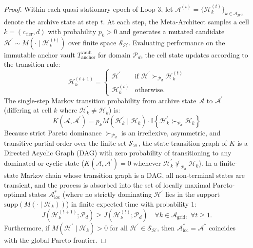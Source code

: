 \documentclass[10pt,twocolumn,letterpaper]{article}
\begin{document}
\begin{proof}
Within each quasi-stationary epoch of Loop 3, let $\mathcal{A}^{(t)}=\{\mathcal{H}_{k}^{(t)}\}_{k\in\mathcal{A}_{\text{grid}}}$ denote the archive state at step $t$. At each step, the Meta-Architect samples a cell $k=(c_{\text{tier}},d)$ with probability $p_{k}>0$ and generates a mutated candidate $\mathcal{H}^{\prime}\sim M(\cdot\mid\mathcal{H}_{k}^{(t)})$ over finite space $\mathcal{S}_{\mathcal{H}}$. Evaluating performance on the immutable anchor vault $T_{\text{anchor}}^{\text{vault}}$ for domain $\mathcal{P}_{d}$, the cell state updates according to the transition rule:
\begin{equation}
\mathcal{H}_{k}^{(t+1)} = \begin{cases}
\mathcal{H}^{\prime} & \text{if }\mathcal{H}^{\prime}\succ_{\mathcal{P}_{d}}\mathcal{H}_{k}^{(t)} \\
\mathcal{H}_{k}^{(t)} & \text{otherwise.}
\end{cases}
\end{equation}
The single-step Markov transition probability from archive state $\mathcal{A}$ to $\mathcal{A}^{\prime}$ (differing at cell $k$ where $\mathcal{H}_{k}^{\prime}\neq\mathcal{H}_{k}$) is:
\begin{equation}
K(\mathcal{A},\mathcal{A}^{\prime}) = p_{k}M(\mathcal{H}_{k}^{\prime}\mid\mathcal{H}_{k})\cdot\mathbb{I}\!\left\{\mathcal{H}_{k}^{\prime}\succ_{\mathcal{P}_{d}}\mathcal{H}_{k}\right\}
\end{equation}
Because strict Pareto dominance $\succ_{\mathcal{P}_{d}}$ is an irreflexive, asymmetric, and transitive partial order over the finite set $\mathcal{S}_{\mathcal{H}}$, the state transition graph of $K$ is a Directed Acyclic Graph (DAG) with zero probability of transitioning to any dominated or cyclic state ($K(\mathcal{A},\mathcal{A}^{\prime})=0$ whenever $\mathcal{H}_{k}^{\prime}\not\succ_{\mathcal{P}_{d}}\mathcal{H}_{k}$). In a finite-state Markov chain whose transition graph is a DAG, all non-terminal states are transient, and the process is absorbed into the set of locally maximal Pareto-optimal states $\mathcal{A}_{\text{loc}}^{*}$ (where no strictly dominating $\mathcal{H}^{\prime}$ lies in the support $\text{supp}(M(\cdot\mid\mathcal{H}_{k}))$) in finite expected time with probability 1:
\begin{equation}
J\!\left(\mathcal{H}_{k}^{(t+1)};\mathcal{P}_{d}\right)\ge J\!\left(\mathcal{H}_{k}^{(t)};\mathcal{P}_{d}\right)\quad \forall k\in\mathcal{A}_{\text{grid}},\;\forall t\ge 1.
\end{equation}
Furthermore, if $M(\mathcal{H}^{\prime}\mid\mathcal{H}_{k})>0$ for all $\mathcal{H}^{\prime}\in\mathcal{S}_{\mathcal{H}}$, then $\mathcal{A}_{\text{loc}}^{*}=\mathcal{A}^{*}$ coincides with the global Pareto frontier.
\end{proof}
\end{document}
